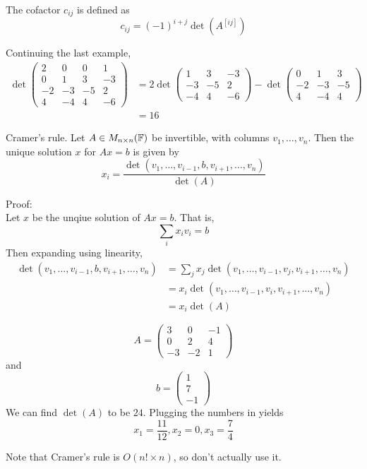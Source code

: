 \documentclass[12pt]{article}
\begin{document}
\begin{defn}
	The cofactor $c_{ij}$ is defined as
	$$c_{ij} = (-1)^{i+j} \det(A^{[ij]})$$
\end{defn}

\begin{ex}
	Continuing the last example,
	\begin{align*}
		\det\begin{pmatrix}2 & 0 & 0 & 1 \\ 0 & 1 & 3 & -3 \\ -2 & -3 & -5 & 2 \\ 4 & -4 & 4 & -6\end{pmatrix} &= 2\det\begin{pmatrix} 1 & 3 & -3 \\ -3 & -5 & 2 \\ -4 & 4 & -6\end{pmatrix} - \det\begin{pmatrix} 0 & 1 & 3 \\ -2 & -3 & -5 \\ 4 & -4 & 4\end{pmatrix} \\
				     &= 16
	\end{align*}
\end{ex}

\begin{thm}
	Cramer's rule. Let $A\in M_{n\times n}(\mathbb{F})$ be invertible, with columns $v_1,\dots,v_n$. Then the unique solution $x$ for $Ax=b$ is given by
	$$x_i = \frac{\det(v_1,\dots,v_{i-1},b,v_{i+1},\dots,v_n)}{\det(A)}$$
\end{thm}

Proof: \\
Let $x$ be the unqiue solution of $Ax=b$. That is,
$$\sum_i x_iv_i = b$$
Then expanding using linearity,
\begin{align*}
	\det(v_1,\dots,v_{i-1},b,v_{i+1},\dots,v_n) &= \sum_j x_j\det(v_1,\dots,v_{i-1},v_j,v_{i+1},\dots,v_n) \\
						    &= x_i\det(v_1,\dots,v_{i-1},v_i,v_{i+1},\dots,v_n) \\
						    &= x_i\det(A)
\end{align*}

\begin{ex}
	$$A=\begin{pmatrix} 3 & 0 & -1 \\ 0 & 2 & 4 \\ -3 & -2 & 1\end{pmatrix}$$
	and
	$$b = \begin{pmatrix} 1 \\ 7 \\ -1\end{pmatrix}$$
	We can find $\det(A)$ to be $24$. Plugging the numbers in yields
	$$x_1 = \frac{11}{12}, x_2 = 0, x_3 = \frac{7}{4}$$
\end{ex}

Note that Cramer's rule is $O(n!\times n)$, so don't actually use it.
\end{document}
